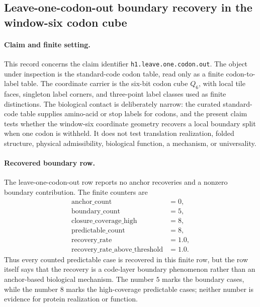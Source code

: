 
\subsection{Leave-one-codon-out boundary recovery in the window-six codon cube}
\label{sec:h1-leave-one-codon-out}

\paragraph{Claim and finite setting.}
This record concerns the claim identifier \texttt{h1.leave.one.codon.out}.  The object under inspection is the standard-code codon table, read only as a finite codon-to-label table.  The coordinate carrier is the six-bit codon cube $Q_6$, with local tile faces, singleton label corners, and three-point label classes used as finite distinctions.  The biological contact is deliberately narrow: the curated standard-code table supplies amino-acid or stop labels for codons, and the present claim tests whether the window-six coordinate geometry recovers a local boundary split when one codon is withheld.  It does not test translation realization, folded structure, physical admissibility, biological function, a mechanism, or universality.

\paragraph{Recovered boundary row.}
The leave-one-codon-out row reports no anchor recoveries and a nonzero boundary contribution.  The finite counters are
$$
\begin{aligned}
\mathrm{anchor\_count} &= 0,\\
\mathrm{boundary\_count} &= 5,\\
\mathrm{closure\_coverage\_high} &= 8,\\
\mathrm{predictable\_count} &= 8,\\
\mathrm{recovery\_rate} &= 1.0,\\
\mathrm{recovery\_rate\_above\_threshold} &= 1.0.
\end{aligned}
$$
Thus every counted predictable case is recovered in this finite row, but the row itself says that the recovery is a code-layer boundary phenomenon rather than an anchor-based biological mechanism.  The number $5$ marks the boundary cases, while the number $8$ marks the high-coverage predictable cases; neither number is evidence for protein realization or function.

